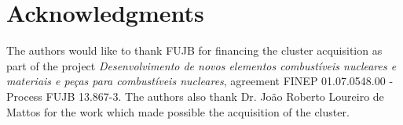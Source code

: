 \documentclass[twoside,a4paper,12pt,english]{inac17}
\begin{document}





\section*{Acknowledgments}
The authors would like to thank FUJB for financing the cluster acquisition
as part of the project \textit{Desenvolvimento de novos elementos combust\'{i}veis nucleares
  e materiais e pe\c{c}as para combust\'{i}veis nucleares}, agreement FINEP 01.07.0548.00 - Process FUJB 13.867-3.
The authors also thank Dr. Jo\~{a}o Roberto Loureiro de Mattos for the work which made possible the acquisition
of the cluster.

\end{document}
